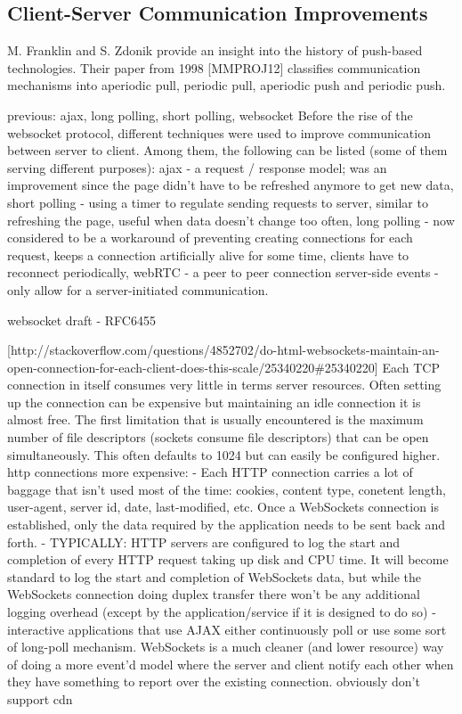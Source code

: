 \documentclass{uvamscse}
\begin{document}
\subsection{Client-Server Communication Improvements}\label{Client-Server Communication Improvements}
M. Franklin and S. Zdonik provide an insight into the history of push-based technologies. Their paper from 1998 [MMPROJ12] classifies communication mechanisms into aperiodic pull, periodic pull, aperiodic push and periodic push.

previous: ajax, long polling, short polling, websocket \cite{PushScale}
Before the rise of the websocket protocol, different techniques were used to improve communication between server to client. Among them, the following can be listed (some of them serving different purposes):
ajax - a request / response model; was an improvement since the page didn’t have to be refreshed anymore to get new data,
short polling - using a timer to regulate sending requests to server, similar to refreshing the page, useful when data doesn’t change too often,
long polling - now considered to be a workaround of preventing creating connections for each request, keeps a connection artificially alive for some time, clients have to reconnect periodically,
webRTC - a peer to peer connection
server-side events - only allow for a server-initiated communication.

websocket draft - RFC6455

[http://stackoverflow.com/questions/4852702/do-html-websockets-maintain-an-open-connection-for-each-client-does-this-scale/25340220\#25340220]
Each TCP connection in itself consumes very little in terms server resources. Often setting up the connection can be expensive but maintaining an idle connection it is almost free. The first limitation that is usually encountered is the maximum number of file descriptors (sockets consume file descriptors) that can be open simultaneously. This often defaults to 1024 but can easily be configured higher.
http connections more expensive:
- Each HTTP connection carries a lot of baggage that isn't used most of the time: cookies, content type, conetent length, user-agent, server id, date, last-modified, etc. Once a WebSockets connection is established, only the data required by the application needs to be sent back and forth.
- TYPICALLY: HTTP servers are configured to log the start and completion of every HTTP request taking up disk and CPU time. It will become standard to log the start and completion of WebSockets data, but while the WebSockets connection doing duplex transfer there won't be any additional logging overhead (except by the application/service if it is designed to do so)
- interactive applications that use AJAX either continuously poll or use some sort of long-poll mechanism. WebSockets is a much cleaner (and lower resource) way of doing a more event'd model where the server and client notify each other when they have something to report over the existing connection.
obviously don't support cdn
\end{document}
